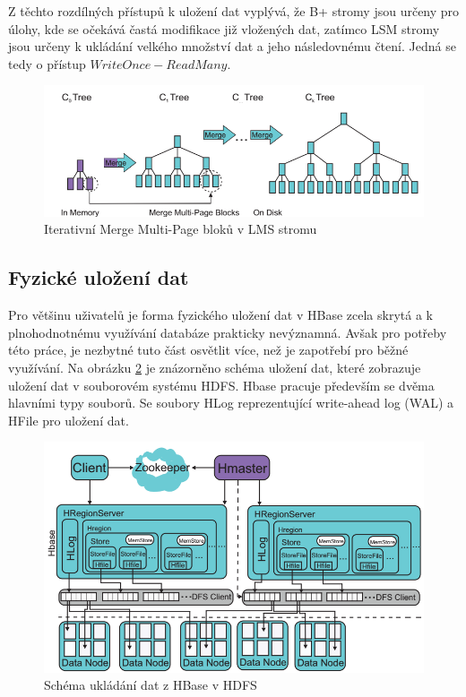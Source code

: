 \documentclass[thesis=M,czech]{FITthesis}[2012/06/26]
\begin{document}
Z těchto rozdílných přístupů k uložení dat vyplývá, že B+ stromy jsou určeny pro úlohy, kde se očekává častá modifikace již vložených dat, zatímco LSM stromy jsou určeny k ukládání velkého množství dat a jeho následovnému čtení. Jedná se tedy o přístup $Write  Once - Read  Many$.


\begin{figure}\centering
	\includegraphics[width=1\textwidth, angle=0]{files/lms}
	\caption[Iterativní Merge Multi-Page bloků v LMS stromu ]{Iterativní Merge Multi-Page bloků v LMS stromu }\label{fig:lms}
\end{figure}

\subsection{Fyzické uložení dat}	
Pro většinu uživatelů je forma fyzického uložení dat v HBase zcela skrytá a k plnohodnotnému využívání databáze prakticky nevýznamná. Avšak pro potřeby této práce, je nezbytné tuto část osvětlit více, než je zapotřebí pro běžné využívání. Na obrázku \ref{fig:hbasehdfs} je znázorněno schéma uložení dat, které zobrazuje uložení dat v souborovém systému HDFS. Hbase pracuje především se dvěma hlavními typy souborů. Se soubory HLog reprezentující write-ahead log (WAL) a HFile pro uložení dat.\cite{hbasecon}

\begin{figure}[h]\centering
	\includegraphics[width=1\textwidth, angle=0]{files/HBaseHDFS}
	\caption[Schéma ukládání dat z HBase v HDFS]{Schéma ukládání dat z HBase v HDFS}\label{fig:hbasehdfs}
\end{figure}
\end{document}
